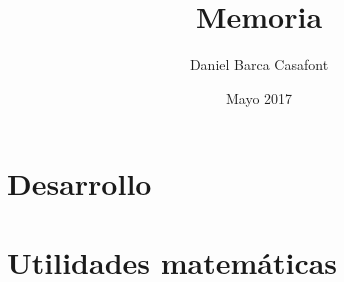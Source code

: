 \documentclass{report}
\title{Memoria}
\author{Daniel Barca Casafont}
\date{Mayo 2017}
\begin{document}
\begin{titlepage}
\maketitle
\end{titlepage}

\cleardoublepage
\tableofcontents

\cleardoublepage
{}
\chapter{Desarrollo}


\cleardoublepage
\appendix
\chapter{Utilidades matemáticas}

\end{document}
